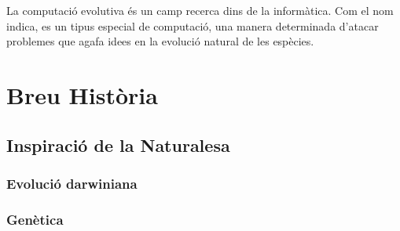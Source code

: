 La computació evolutiva és un camp recerca dins de la informàtica.  Com el nom
indica, es un tipus especial de computació, una manera determinada d'atacar
problemes que agafa idees en la evolució natural de les espècies.

\section{Breu Història} %
\label{sec:Breu Historia}

\subsection{Inspiració de la Naturalesa} %
\label{sub:Inspiracio de la Naturalesa}

\subsubsection{Evolució darwiniana} %
\label{ssub:Evolucio darwiniana}

\subsubsection{Genètica} %
\label{ssub:Genetica}




